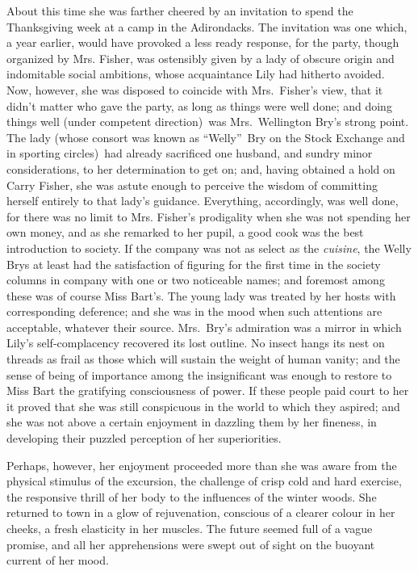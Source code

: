 \documentclass[12pt,a4paper]{book}
\begin{document}
About this time she was farther cheered by an invitation to spend
the Thanksgiving week at a camp in the Adirondacks. The
invitation was one which, a year earlier, would have provoked a
less ready response, for the party, though organized by Mrs.
Fisher, was ostensibly given by a lady of obscure origin and
indomitable social ambitions, whose acquaintance Lily had
hitherto avoided. Now, however, she was disposed to coincide with
Mrs.\ Fisher's view, that it didn't matter who gave the party, as
long as things were well done; and doing things well (under
competent direction)\ was Mrs.\ Wellington Bry's strong point. The
lady (whose consort was known as ``Welly''\ Bry on the Stock
Exchange and in sporting circles)\ had already sacrificed
one husband, and sundry minor considerations, to her
determination to get on; and, having obtained a hold on Carry
Fisher, she was astute enough to perceive the wisdom of
committing herself entirely to that lady's guidance. Everything,
accordingly, was well done, for there was no limit to Mrs.
Fisher's prodigality when she was not spending her own money, and
as she remarked to her pupil, a good cook was the best
introduction to society. If the company was not as select as the
\textit{cuisine}, the Welly Brys at least had the satisfaction of
figuring for the first time in the society columns in company
with one or two noticeable names; and foremost among these was of
course Miss Bart's. The young lady was treated by her hosts with
corresponding deference; and she was in the mood when such
attentions are acceptable, whatever their source. Mrs.\ Bry's
admiration was a mirror in which Lily's self-complacency
recovered its lost outline. No insect hangs its nest on threads
as frail as those which will sustain the weight of human vanity;
and the sense of being of importance among the insignificant was
enough to restore to Miss Bart the gratifying consciousness of
power. If these people paid court to her it proved that she was
still conspicuous in the world to which they aspired; and she was
not above a certain enjoyment in dazzling them by her fineness,
in developing their puzzled perception of her superiorities.





Perhaps, however, her enjoyment proceeded more than she was aware
from the physical stimulus of the excursion, the challenge of
crisp cold and hard exercise, the responsive thrill of her body
to the influences of the winter woods. She returned to town in a
glow of rejuvenation, conscious of a clearer colour in her
cheeks,
a fresh elasticity in her muscles. The future seemed full of a
vague promise, and all her apprehensions were swept out of sight
on the buoyant current of her mood.
\end{document}
